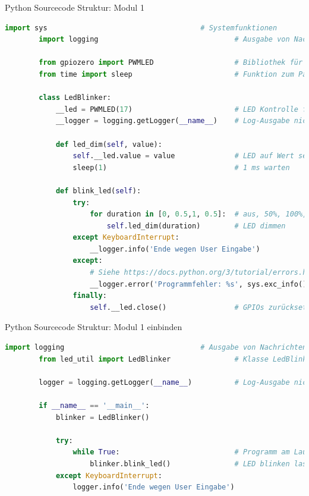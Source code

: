 \begin{frame}[fragile]{Python Sourcecode Struktur: Modul 1}
    \begin{lstlisting}[language=Python, gobble=8]
        import sys                                    # Systemfunktionen
        import logging                                # Ausgabe von Nachrichten

        from gpiozero import PWMLED                   # Bibliothek für PWM-Ansteuerung
        from time import sleep                        # Funktion zum Pausieren

        class LedBlinker:
            __led = PWMLED(17)                        # LED Kontrolle für GPIO PIN 17
            __logger = logging.getLogger(__name__)    # Log-Ausgabe nicht mit print()

            def led_dim(self, value):
                self.__led.value = value              # LED auf Wert setzen
                sleep(1)                              # 1 ms warten

            def blink_led(self):
                try:
                    for duration in [0, 0.5,1, 0.5]:  # aus, 50%, 100%, 50%
                        self.led_dim(duration)        # LED dimmen
                except KeyboardInterrupt:
                    __logger.info('Ende wegen User Eingabe')
                except:
                    # Siehe https://docs.python.org/3/tutorial/errors.html
                    __logger.error('Programmfehler: %s', sys.exc_info()[0])
                finally:
                    self.__led.close()                # GPIOs zurücksetzen
    \end{lstlisting}
\end{frame}

\begin{frame}[fragile]{Python Sourcecode Struktur: Modul 1 einbinden}
    \begin{lstlisting}[language=Python, gobble=8]
        import logging                                # Ausgabe von Nachrichten
        from led_util import LedBlinker               # Klasse LedBlinker

        logger = logging.getLogger(__name__)          # Log-Ausgabe nicht mit print()

        if __name__ == '__main__':
            blinker = LedBlinker()

            try:
                while True:                           # Programm am Laufen halten
                    blinker.blink_led()               # LED blinken lassen
            except KeyboardInterrupt:
                logger.info('Ende wegen User Eingabe')
    \end{lstlisting}
\end{frame}

